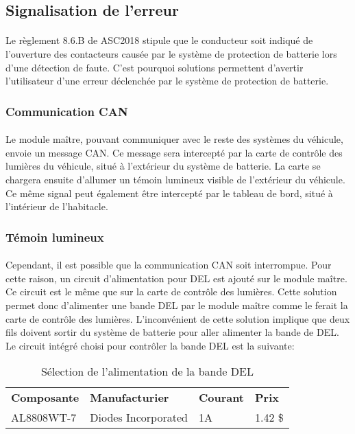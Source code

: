 
\subsection{Signalisation de l'erreur}

	\paragraph*{}
	Le règlement 8.6.B de ASC2018\cite{ASC2018} stipule que le conducteur soit indiqué de l'ouverture des contacteurs causée par le système de protection de batterie lors d'une détection de faute. C'est pourquoi solutions permettent d'avertir l'utilisateur d'une erreur déclenchée par le système de protection de batterie. 
	
	\subsubsection*{Communication CAN}
		\paragraph*{}
		Le module maître, pouvant communiquer avec le reste des systèmes du véhicule, envoie un message CAN. Ce message sera intercepté par la carte de contrôle des lumières du véhicule, situé à l'extérieur du système de batterie. La carte se chargera ensuite d'allumer un témoin lumineux visible de l'extérieur du véhicule. Ce même signal peut également être intercepté par le tableau de bord, situé à l'intérieur de l'habitacle.
		
	\subsubsection*{Témoin lumineux}
		\paragraph*{}
		Cependant, il est possible que la communication CAN soit interrompue. Pour cette raison, un circuit d'alimentation pour DEL est ajouté sur le module maître. Ce circuit est le même que sur la carte de contrôle des lumières. Cette solution permet donc d'alimenter une bande DEL par le module maître comme le ferait la carte de contrôle des lumières. L'inconvénient de cette solution implique que deux fils doivent sortir du système de batterie pour aller alimenter la bande de DEL. Le circuit intégré choisi pour contrôler la bande DEL est la suivante:
	
	\begin{table}[H]
		\centering
		\caption{Sélection de l'alimentation de la bande DEL}
		\label{LedDriver}
		\begin{tabular}{|p{3cm}|p{4cm}|p{2cm}|p{1.5cm}|}
			\hline
			\textbf{Composante} & \textbf{Manufacturier} & \textbf{Courant} & \textbf{Prix}
			\\ \hhline{|=|=|=|=|}
			AL8808WT-7 & Diodes Incorporated  & 1A & 1.42 \$ \\ \hline		
		\end{tabular}
	\end{table}		

